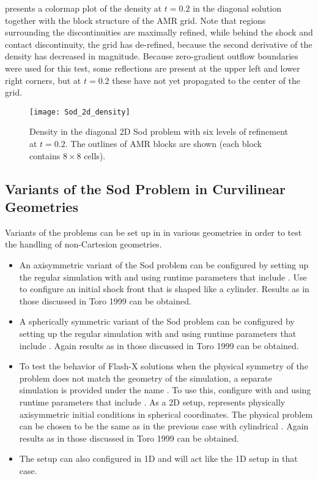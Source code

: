  presents a colormap plot of the density at
$t=0.2$ in the diagonal solution together with the block structure
of the AMR grid. Note that regions surrounding the discontinuities
are maximally refined, while behind the shock and contact
discontinuity, the grid has de-refined, because the second
derivative of the density has decreased in magnitude. Because
zero-gradient outflow boundaries were used for this test, some
reflections are present at the upper left and lower right corners,
but at $t=0.2$ these have not yet propagated to the center of the
grid.

\begin{figure}[!ht]
\begin{center}
{\leavevmode\texttt{[image: Sod\_2d\_density]}}
\end{center}
\caption{\label{Fig:Sod density} Density in the diagonal 2D Sod problem
with six levels of refinement at $t=0.2$. The outlines of AMR blocks are
shown (each block contains $8\times8$ cells).
}
\end{figure}


\subsection{Variants of the Sod Problem in Curvilinear Geometries}
\label{Sec:SimulationSodCurvi}
Variants of the  problems can be set up in in various 
geometries in order to test the handling of non-Cartesion geometries.

\begin{itemize}
\item
An axisymmetric variant of the Sod problem can be configured by
setting up the regular  simulation with 
 and using runtime parameters
that include . 
Use 
to configure an initial shock front that is shaped like a cylinder.
Results as in those discussed in Toro 1999 can be obtained.
\item
A spherically symmetric variant of the Sod problem can be configured by
setting up the regular  simulation with 
 and using runtime parameters
that include .
Again results as in those discussed in Toro 1999 can be obtained.
\item
To test the behavior of Flash-X solutions when the physical symmetry of the
problem does not match the geometry of the simulation,
a separate simulation is provided under the name .
To use this, configure with 
 and using runtime parameters
that include .
As a 2D setup,  represents physically axisymmetric
initial conditions in spherical coordinates. The physical problem
can be chosen to be the same as in the previous case with cylindrical .
Again results as in those discussed in Toro 1999 can be obtained.
\item
The  setup can also configured in 1D and will act
like the 1D  setup in that case.
\end{itemize}


